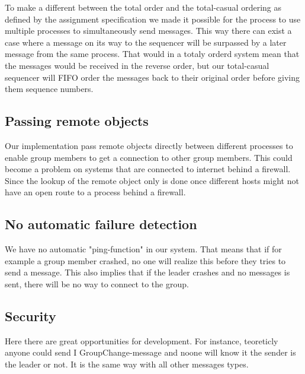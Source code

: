 \documentclass[titlepage, twocolumn, a4paper, 10pt]{article}
\begin{document}
To make a different between the total order and the total-casual
ordering as defined by the assignment specification we made it
possible for the process to use multiple processes to simultaneously
send messages. This way there can exist a case where a message on its
way to the sequencer will be surpassed by a later message from the
same process. That would in a totaly orderd system mean that the
messages would be received in the reverse order, but our total-casual
sequencer will FIFO order the messages back to their original order
before giving them sequence numbers.

\subsection{Passing remote objects}\label{sec:passing-remote-ojbects}
Our implementation pass remote objects directly between different
processes to enable group members to get a connection to other group
members. This could become a problem on systems that are connected to
internet behind a firewall. Since the lookup of the remote object only
is done once different hosts might not have an open route to a process
behind a firewall.

\subsection{No automatic failure detection}\label{sec:no-automatic-failure-detection}
We have no automatic "ping-function" in our system. That means that if for example
a group member crashed, no one will realize this before they tries to send a message. This also
implies that if the leader crashes and no messages is sent, there will be no way to connect to the group.

\subsection{Security}\label{sec:security}
Here there are great opportunities for development. For instance, teoreticly anyone could send I 
GroupChange-message and noone will know it the sender is the leader or not. It is the same way 
with all other messages types.
\end{document}
